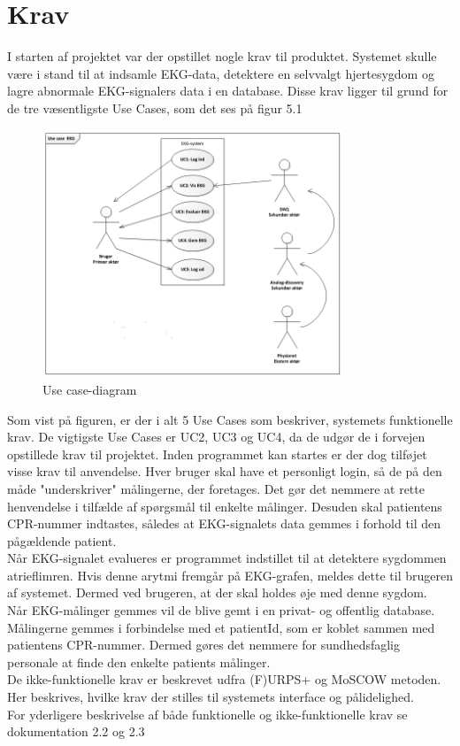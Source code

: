 \chapter{Krav}
I starten af projektet var der opstillet nogle krav til produktet. Systemet skulle være i stand til at indsamle EKG-data, detektere en selvvalgt hjertesygdom og lagre abnormale EKG-signalers data i en database. Disse krav ligger til grund for de tre væsentligste Use Cases, som det ses på figur 5.1

\begin{figure}[H]
	\centering
	\includegraphics[width=0.8\textwidth]{Figurer/Snip20150518_11}
	\caption{Use case-diagram}
	\label{fig:Use Cases}
\end{figure}

Som vist på figuren, er der i alt 5 Use Cases som beskriver, systemets funktionelle krav. De vigtigste Use Cases er UC2, UC3 og UC4, da de udgør de i forvejen opstillede krav til projektet. Inden programmet kan startes er der dog tilføjet visse krav til anvendelse. Hver bruger skal have et personligt login, så de på den måde "underskriver" målingerne, der foretages. Det gør det nemmere at rette henvendelse i tilfælde af spørgsmål til enkelte målinger. Desuden skal patientens CPR-nummer indtastes, således at EKG-signalets data gemmes i forhold til den pågældende patient.\\
Når EKG-signalet evalueres er programmet indstillet til at detektere sygdommen atrieflimren. Hvis denne arytmi fremgår på EKG-grafen, meldes dette til brugeren af systemet. Dermed ved brugeren, at der skal holdes øje med denne sygdom.\\
Når EKG-målinger gemmes vil de blive gemt i en privat- og offentlig database. Målingerne gemmes i forbindelse med et patientId, som er koblet sammen med patientens CPR-nummer. Dermed gøres det nemmere for sundhedsfaglig personale at finde den enkelte patients målinger.\\
De ikke-funktionelle krav er beskrevet udfra (F)URPS+ og MoSCOW metoden. Her beskrives, hvilke krav der stilles til systemets interface og pålidelighed.\\
For yderligere beskrivelse af både funktionelle og ikke-funktionelle krav se dokumentation 2.2 og 2.3\\
 